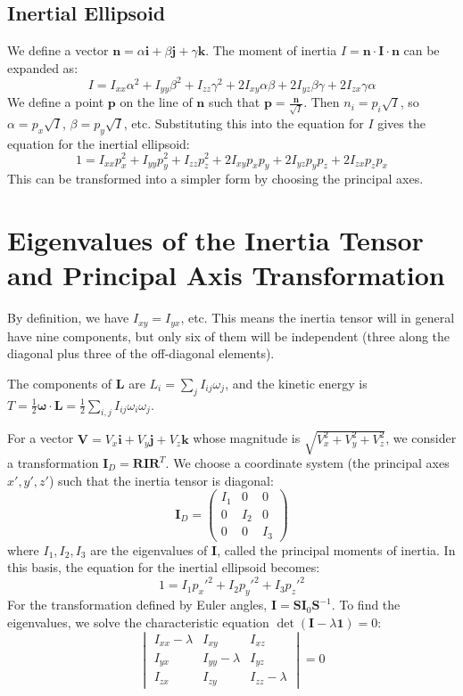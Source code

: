 \documentclass[12pt]{article}
\renewcommand{\vec}[1]{\mathbf{#1}}
\begin{document}
	\subsection{Inertial Ellipsoid}
	We define a vector $\vec{n} = \alpha \vec{i} + \beta \vec{j} + \gamma \vec{k}$. The moment of inertia $I = \vec{n} \cdot \mathbf{I} \cdot \vec{n}$ can be expanded as:
	\[
	I = I_{xx}\alpha^2 + I_{yy}\beta^2 + I_{zz}\gamma^2 + 2I_{xy}\alpha\beta + 2I_{yz}\beta\gamma + 2I_{zx}\gamma\alpha
	\]
	We define a point $\vec{p}$ on the line of $\vec{n}$ such that $\vec{p} = \frac{\vec{n}}{\sqrt{I}}$.
	Then $n_i = p_i \sqrt{I}$, so $\alpha=p_x\sqrt{I}$, $\beta=p_y\sqrt{I}$, etc.
	Substituting this into the equation for $I$ gives the equation for the inertial ellipsoid:
	\[
	1 = I_{xx}p_x^2 + I_{yy}p_y^2 + I_{zz}p_z^2 + 2I_{xy}p_x p_y + 2I_{yz}p_y p_z + 2I_{zx}p_z p_x
	\]
	This can be transformed into a simpler form by choosing the principal axes.
	
	\section{Eigenvalues of the Inertia Tensor and Principal Axis Transformation}
	
	By definition, we have $I_{xy} = I_{yx}$, etc. This means the inertia tensor will in general have nine components, but only six of them will be independent (three along the diagonal plus three of the off-diagonal elements).
	
	The components of $\vec{L}$ are $L_i = \sum_j I_{ij} \omega_j$, and the kinetic energy is $T = \frac{1}{2} \vec{\omega} \cdot \vec{L} = \frac{1}{2} \sum_{i,j} I_{ij} \omega_i \omega_j$.
	
	For a vector $\vec{V} = V_x\vec{i} + V_y\vec{j} + V_z\vec{k}$ whose magnitude is $\sqrt{V_x^2 + V_y^2 + V_z^2}$, we consider a transformation $\mathbf{I}_D = \mathbf{R} \mathbf{I} \mathbf{R}^T$.
	We choose a coordinate system (the principal axes $x', y', z'$) such that the inertia tensor is diagonal:
	\[
	\mathbf{I}_D =
	\begin{pmatrix}
		I_1 & 0 & 0 \\
		0 & I_2 & 0 \\
		0 & 0 & I_3
	\end{pmatrix}
	\]
	where $I_1, I_2, I_3$ are the eigenvalues of $\mathbf{I}$, called the principal moments of inertia. In this basis, the equation for the inertial ellipsoid becomes:
	\[
	1 = I_1 p_x'^2 + I_2 p_y'^2 + I_3 p_z'^2
	\]
	For the transformation defined by Euler angles, $\mathbf{I} = \mathbf{S} \mathbf{I}_0 \mathbf{S}^{-1}$.
	To find the eigenvalues, we solve the characteristic equation $\det(\mathbf{I} - \lambda \mathbf{1}) = 0$:
	\[
	\begin{vmatrix}
		I_{xx} - \lambda & I_{xy} & I_{xz} \\
		I_{yx} & I_{yy} - \lambda & I_{yz} \\
		I_{zx} & I_{zy} & I_{zz} - \lambda
	\end{vmatrix} = 0
	\]
	
\end{document}
